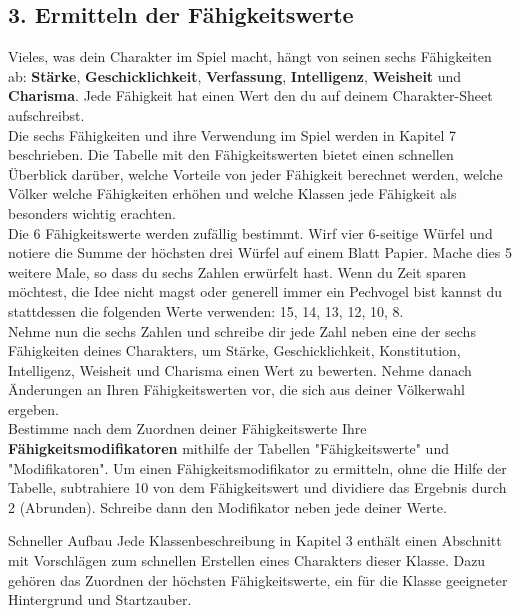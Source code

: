 \subsection{3. Ermitteln der Fähigkeitswerte}
Vieles, was dein Charakter im Spiel macht, hängt von seinen sechs Fähigkeiten ab:
\textbf{Stärke}, \textbf{Geschicklichkeit}, \textbf{Verfassung}, \textbf{Intelligenz}, \textbf{Weisheit} und \textbf{Charisma}. Jede Fähigkeit hat einen Wert den du	auf deinem Charakter-Sheet aufschreibst. \\
Die sechs Fähigkeiten und ihre Verwendung im Spiel werden in Kapitel 7 beschrieben. Die Tabelle mit den Fähigkeitswerten bietet einen schnellen Überblick darüber, welche Vorteile von jeder Fähigkeit berechnet werden, welche Völker welche Fähigkeiten erhöhen und welche Klassen jede Fähigkeit als besonders wichtig erachten.\\
Die 6 Fähigkeitswerte werden zufällig bestimmt. Wirf vier 6-seitige Würfel und notiere die Summe der höchsten drei Würfel auf einem Blatt Papier.
Mache dies 5 weitere Male, so dass du sechs Zahlen erwürfelt hast. Wenn du Zeit sparen möchtest, die Idee nicht magst oder generell immer ein Pechvogel bist kannst du stattdessen die folgenden Werte verwenden: 15, 14, 13, 12, 10, 8.\\
Nehme nun die sechs Zahlen und schreibe dir jede Zahl neben eine der sechs Fähigkeiten deines Charakters, um Stärke, Geschicklichkeit, Konstitution, Intelligenz, Weisheit und Charisma einen Wert zu bewerten. Nehme danach Änderungen an Ihren Fähigkeitswerten vor, die sich aus deiner Völkerwahl ergeben.\\
Bestimme nach dem Zuordnen deiner Fähigkeitswerte Ihre \textbf{Fähigkeitsmodifikatoren} mithilfe der Tabellen "Fähigkeitswerte" und "Modifikatoren". Um einen Fähigkeitsmodifikator zu ermitteln, ohne die Hilfe der Tabelle, subtrahiere 10 von dem Fähigkeitswert und dividiere das Ergebnis durch 2 (Abrunden). Schreibe dann den Modifikator neben jede deiner Werte.
\newpage
\begin{commentbox}{Schneller Aufbau}
Jede Klassenbeschreibung in Kapitel 3 enthält einen Abschnitt mit Vorschlägen zum schnellen Erstellen eines Charakters dieser Klasse. Dazu gehören das Zuordnen der höchsten Fähigkeitswerte, ein für die Klasse geeigneter Hintergrund und Startzauber.
\end{commentbox}

